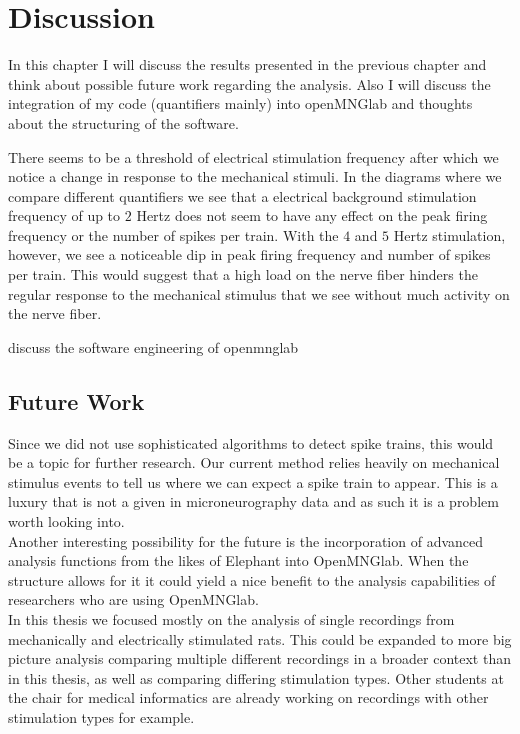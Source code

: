 \chapter{Discussion}

In this chapter I will discuss the results presented in the previous chapter and think about possible future work regarding the analysis. Also I will discuss the integration of my code (quantifiers mainly) into openMNGlab and thoughts about the structuring of the software.

There seems to be a threshold of electrical stimulation frequency after which we notice a change in response to the mechanical stimuli. In the diagrams where we compare different quantifiers we see that a electrical background stimulation frequency of up to $2$ Hertz does not seem to have any effect on the peak firing frequency or the number of spikes per train. With the $4$ and $5$ Hertz stimulation, however, we see a noticeable dip in peak firing frequency and number of spikes per train. This would suggest that a high load on the nerve fiber hinders the regular response to the mechanical stimulus that we see without much activity on the nerve fiber.

discuss the software engineering of openmnglab

\section{Future Work}
Since we did not use sophisticated algorithms to detect spike trains, this would be a topic for further research. Our current method relies heavily on mechanical stimulus events to tell us where we can expect a spike train to appear. This is a luxury that is not a given in microneurography data and as such it is a problem worth looking into.\\
Another interesting possibility for the future is the incorporation of advanced analysis functions from the likes of Elephant into OpenMNGlab. When the structure allows for it it could yield a nice benefit to the analysis capabilities of researchers who are using OpenMNGlab.\\
In this thesis we focused mostly on the analysis of single recordings from mechanically and electrically stimulated rats. This could be expanded to more big picture analysis comparing multiple different recordings in a broader context than in this thesis, as well as comparing differing stimulation types. Other students at the chair for medical informatics are already working on recordings with other stimulation types for example.\\





\cleardoublepage
